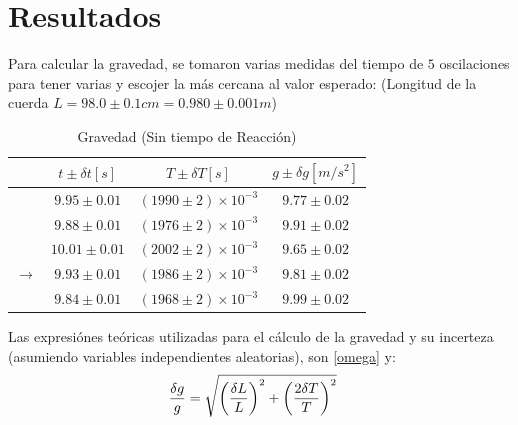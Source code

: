 \documentclass[conference]{IEEEtran}
\begin{document}
\section{Resultados}
    Para calcular la gravedad, se tomaron varias medidas del tiempo de $5$ oscilaciones para tener varias y escojer la más cercana al valor esperado: (Longitud de la cuerda $L = 98.0 \pm 0.1 cm = 0.980 \pm 0.001 m$)
    \begin{table}[H]
    	\centering
    	\caption{Gravedad (Sin tiempo de Reacción)}
    	\begin{tabular}{||c||c|c|c||}
    		\hline
    		\hline
    			& $t\pm \delta t [s]$ & $T \pm \delta T [s]$ & $g \pm \delta g [m/s^2]$ \\
    		\hline
    		\hline
    			& $9.95 \pm 0.01$ & $(1990 \pm 2) \times 10^{-3}$ & $9.77 \pm  0.02$ \\
    			
    			& $9.88 \pm 0.01$ & $(1976 \pm 2) \times 10^{-3}$ & $9.91 \pm  0.02$ \\
    			& $10.01 \pm 0.01$ & $(2002 \pm 2) \times 10^{-3}$ & $9.65 \pm  0.02$ \\
    			$\to$ & $9.93 \pm 0.01$ & $(1986 \pm 2) \times 10^{-3}$ & $9.81 \pm  0.02$ \\
    			& $9.84 \pm 0.01$ & $(1968 \pm 2) \times 10^{-3}$ & $9.99 \pm  0.02$ \\		
    		\hline
    		\hline
    	\end{tabular}
    	\label{tab:res1}
    \end{table}
    
    Las expresiónes teóricas utilizadas para el cálculo de la gravedad y su incerteza (asumiendo variables independientes aleatorias), son \eqref{omega} y:
    \begin{align*}
    	\frac{\delta g}{g} &= \sqrt{\qty(\frac{\delta L}{L})^2 + \qty(\frac{2\delta T}{T})^2}
    \end{align*}
    
\end{document}
